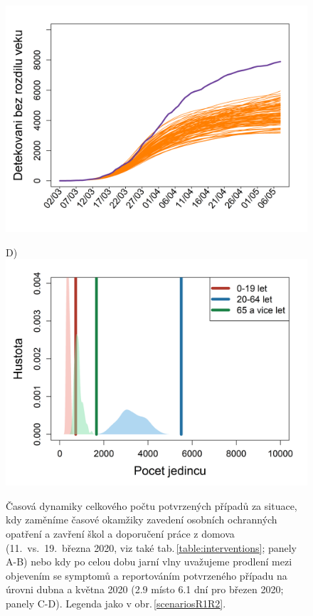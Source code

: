 \begin{figure}
\begin{center}
\begin{minipage}[m]{0.45\textwidth}
			\includegraphics[width = \textwidth]{pic/sc_testing.png}
		\end{minipage}
		\begin{minipage}[m]{0.45\textwidth}
			D) \\
			\includegraphics[width = \textwidth]{pic/sc_testing_PDF.png}
		\end{minipage}
	\end{center}
	\caption{Časová dynamiky celkového počtu potvrzených případů za situace, kdy zaměníme časové okamžiky zavedení osobních ochranných opatření a zavření škol a doporučení práce z domova  (11.\ vs.\ 19.\ března 2020, viz také tab.\,\ref{table:interventions}; panely A-B) nebo kdy po celou dobu jarní vlny uvažujeme prodlení mezi objevením se symptomů a reportováním potvrzeného případu na úrovni dubna a května 2020 (2.9 místo 6.1 dní pro březen 2020; panely C-D). Legenda jako v obr.\,\ref{scenariosR1R2}.}
	\label{switch}
\end{figure}

